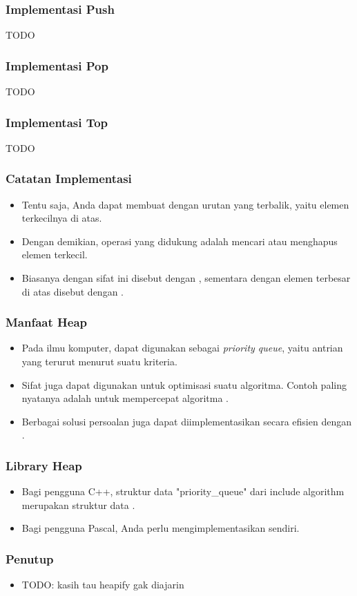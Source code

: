 \begin{frame}
\frametitle{Implementasi Push}
TODO
\end{frame}

\begin{frame}
\frametitle{Implementasi Pop}
TODO
\end{frame}

\begin{frame}
\frametitle{Implementasi Top}
TODO
\end{frame}

\begin{frame}
\frametitle{Catatan Implementasi}
\begin{itemize}
  \item Tentu saja, Anda dapat membuat \pheap dengan urutan yang terbalik, yaitu elemen terkecilnya di atas.
  \item Dengan demikian, operasi yang didukung adalah mencari atau menghapus elemen terkecil.
  \item Biasanya \pheap dengan sifat ini disebut dengan , sementara \pheap dengan elemen terbesar di atas disebut dengan .
\end{itemize}
\end{frame}

\begin{frame}
\frametitle{Manfaat Heap}
\begin{itemize}
  \item Pada ilmu komputer, \pheap dapat digunakan sebagai \textit{priority queue}, yaitu antrian yang terurut menurut suatu kriteria.
  \item Sifat \pheap juga dapat digunakan untuk optimisasi suatu algoritma. Contoh paling nyatanya adalah untuk mempercepat algoritma .
  \item Berbagai solusi persoalan  juga dapat diimplementasikan secara efisien dengan \pheap.
\end{itemize}
\end{frame}

\begin{frame}
\frametitle{Library Heap}
\begin{itemize}
  \item Bagi pengguna C++, struktur data "priority\_queue" dari include algorithm merupakan struktur data \pheap.
  \item Bagi pengguna Pascal, Anda perlu mengimplementasikan \pheap sendiri.
\end{itemize}
\end{frame}

\begin{frame}
\frametitle{Penutup}
\begin{itemize}
  \item TODO: kasih tau heapify gak diajarin
\end{itemize}
\end{frame}




